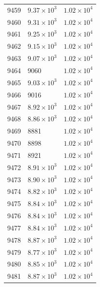 \begin{table}[H]
\begin{tabular}{lll}
9459 & $\displaystyle 9.37 \times 10^{3}$ & $\displaystyle 1.02 \times 10^{4}$ \\
9460 & $\displaystyle 9.31 \times 10^{3}$ & $\displaystyle 1.02 \times 10^{4}$ \\
9461 & $\displaystyle 9.25 \times 10^{3}$ & $\displaystyle 1.02 \times 10^{4}$ \\
9462 & $\displaystyle 9.15 \times 10^{3}$ & $\displaystyle 1.02 \times 10^{4}$ \\
9463 & $\displaystyle 9.07 \times 10^{3}$ & $\displaystyle 1.02 \times 10^{4}$ \\
9464 & 9060 & $\displaystyle 1.02 \times 10^{4}$ \\
9465 & $\displaystyle 9.03 \times 10^{3}$ & $\displaystyle 1.02 \times 10^{4}$ \\
9466 & 9016 & $\displaystyle 1.02 \times 10^{4}$ \\
9467 & $\displaystyle 8.92 \times 10^{3}$ & $\displaystyle 1.02 \times 10^{4}$ \\
9468 & $\displaystyle 8.86 \times 10^{3}$ & $\displaystyle 1.02 \times 10^{4}$ \\
9469 & 8881 & $\displaystyle 1.02 \times 10^{4}$ \\
9470 & 8898 & $\displaystyle 1.02 \times 10^{4}$ \\
9471 & 8921 & $\displaystyle 1.02 \times 10^{4}$ \\
9472 & $\displaystyle 8.91 \times 10^{3}$ & $\displaystyle 1.02 \times 10^{4}$ \\
9473 & $\displaystyle 8.90 \times 10^{3}$ & $\displaystyle 1.02 \times 10^{4}$ \\
9474 & $\displaystyle 8.82 \times 10^{3}$ & $\displaystyle 1.02 \times 10^{4}$ \\
9475 & $\displaystyle 8.84 \times 10^{3}$ & $\displaystyle 1.02 \times 10^{4}$ \\
9476 & $\displaystyle 8.84 \times 10^{3}$ & $\displaystyle 1.02 \times 10^{4}$ \\
9477 & $\displaystyle 8.84 \times 10^{3}$ & $\displaystyle 1.02 \times 10^{4}$ \\
9478 & $\displaystyle 8.87 \times 10^{3}$ & $\displaystyle 1.02 \times 10^{4}$ \\
9479 & $\displaystyle 8.77 \times 10^{3}$ & $\displaystyle 1.02 \times 10^{4}$ \\
9480 & $\displaystyle 8.85 \times 10^{3}$ & $\displaystyle 1.02 \times 10^{4}$ \\
9481 & $\displaystyle 8.87 \times 10^{3}$ & $\displaystyle 1.02 \times 10^{4}$ \\

\end{tabular}
\end{table}
